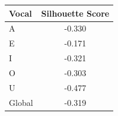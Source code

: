 \begin{tabular}{lc}
\toprule
\rowcolor{col01}
Vocal & Silhouette Score \\
\midrule
A & -0.330 \\
E & -0.171 \\
I & -0.321 \\
O & -0.303 \\
U & -0.477 \\
Global & -0.319 \\
\bottomrule
\end{tabular}
